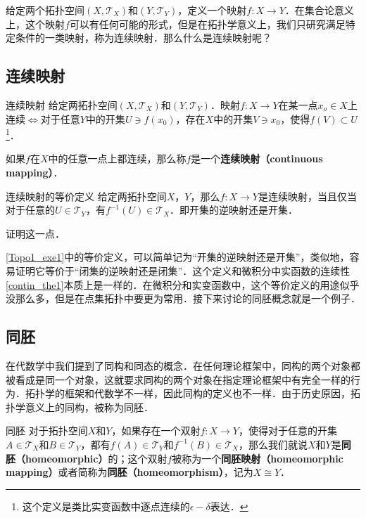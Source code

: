 给定两个拓扑空间$(X, \mathcal{T}_X)$和$(Y, \mathcal{T}_Y)$，定义一个映射$f:X\rightarrow Y$．在集合论意义上，这个映射$f$可以有任何可能的形式，但是在拓扑学意义上，我们只研究满足特定条件的一类映射，称为连续映射．那么什么是连续映射呢？

\subsection{连续映射}
\begin{definition}{连续映射}
给定两拓扑空间$(X, \mathcal{T}_X)$和$(Y, \mathcal{T}_Y)$．映射$f:X\rightarrow Y$在某一点$x_o\in X$上连续$\iff$对于任意$Y$中的开集$U\ni f(x_0)$，存在$X$中的开集$V\ni x_0$，使得$f(V)\subset U$\footnote{这个定义是类比实变函数中逐点连续的$\epsilon-\delta$表达．}．

如果$f$在$X$中的任意一点上都连续，那么称$f$是一个\textbf{连续映射（continuous mapping）}．
\end{definition}

\begin{exercise}{连续映射的等价定义}\label{Topo1_exe1}
给定两拓扑空间$X$，$Y$，那么$f:X\rightarrow Y$是连续映射，当且仅当对于任意的$U\in\mathcal{T}_Y$，有$f^{-1}(U)\in\mathcal{T}_X$．即开集的逆映射还是开集．

证明这一点．
\end{exercise}

\autoref{Topo1_exe1}中的等价定义，可以简单记为“开集的逆映射还是开集”，类似地，容易证明它等价于“闭集的逆映射还是闭集”．这个定义和微积分中实函数的连续性\autoref{contin_the1}本质上是一样的．在微积分和实变函数中，这个等价定义的用途似乎没那么多，但是在点集拓扑中要更为常用．接下来讨论的同胚概念就是一个例子．

\subsection{同胚}

在代数学中我们提到了同构和同态的概念．在任何理论框架中，同构的两个对象都被看成是同一个对象，这就要求同构的两个对象在指定理论框架中有完全一样的行为．拓扑学的框架和代数学不一样，因此同构的定义也不一样．由于历史原因，拓扑学意义上的同构，被称为同胚．

\begin{definition}{同胚}
对于拓扑空间$X$和$Y$，如果存在一个双射$f:X\rightarrow Y$，使得对于任意的开集$A\in\mathcal{T}_X$和$B\in\mathcal{T}_Y$，都有$f(A)\in\mathcal{T}_Y$和$f^{-1}(B)\in\mathcal{T}_X$，那么我们就说$X$和$Y$是\textbf{同胚（homeomorphic）}的；这个双射$f$被称为一个\textbf{同胚映射（homeomorphic mapping）}或者简称为\textbf{同胚（homeomorphism）}，记为$X\cong Y$．
\end{definition}

